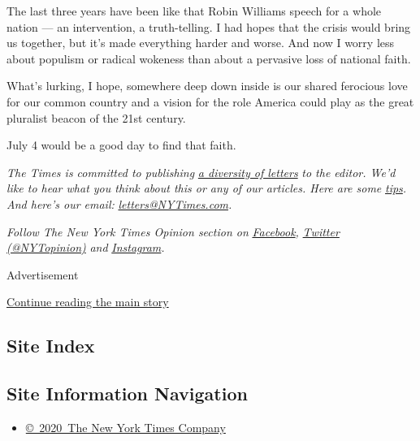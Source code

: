 The last three years have been like that Robin Williams speech for a
whole nation --- an intervention, a truth-telling. I had hopes that the
crisis would bring us together, but it's made everything harder and
worse. And now I worry less about populism or radical wokeness than
about a pervasive loss of national faith.

What's lurking, I hope, somewhere deep down inside is our shared
ferocious love for our common country and a vision for the role America
could play as the great pluralist beacon of the 21st century.

July 4 would be a good day to find that faith.

\emph{The Times is committed to publishing}
\href{https://www.nytimes3xbfgragh.onion/2019/01/31/opinion/letters/letters-to-editor-new-york-times-women.html}{\emph{a
diversity of letters}} \emph{to the editor. We'd like to hear what you
think about this or any of our articles. Here are some}
\href{https://help.nytimes3xbfgragh.onion/hc/en-us/articles/115014925288-How-to-submit-a-letter-to-the-editor}{\emph{tips}}\emph{.
And here's our email:}
\href{mailto:letters@NYTimes.com}{\emph{letters@NYTimes.com}}\emph{.}

\emph{Follow The New York Times Opinion section on}
\href{https://www.facebookcorewwwi.onion/nytopinion}{\emph{Facebook}}\emph{,}
\href{http://twitter.com/NYTOpinion}{\emph{Twitter (@NYTopinion)}}
\emph{and}
\href{https://www.instagram.com/nytopinion/}{\emph{Instagram}}\emph{.}

Advertisement

\protect\hyperlink{after-bottom}{Continue reading the main story}

\hypertarget{site-index}{%
\subsection{Site Index}\label{site-index}}

\hypertarget{site-information-navigation}{%
\subsection{Site Information
Navigation}\label{site-information-navigation}}

\begin{itemize}
\tightlist
\item
  \href{https://help.nytimes3xbfgragh.onion/hc/en-us/articles/115014792127-Copyright-notice}{©~2020~The
  New York Times Company}
\end{itemize}

